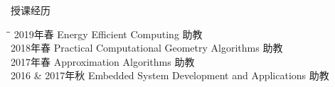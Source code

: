 
\begin{rSection}{授课经历}
\begin{tabbing}
\hspace{1.5in}\= \hspace{3.5in}\=\kill
    2019年春 \> Energy Efficient Computing \> 助教\\
    2018年春 \> Practical Computational Geometry Algorithms \> 助教 \\
    2017年春 \> Approximation Algorithms \> 助教 \\
    2016 \& 2017年秋 \>  Embedded System Development and Applications \> 助教
\end{tabbing}
\end{rSection}

